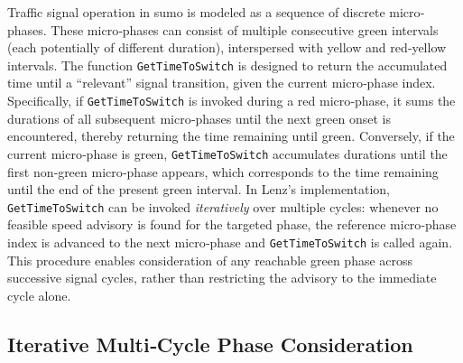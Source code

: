 Traffic signal operation in \ac{sumo} is modeled as a sequence of discrete micro‐phases. These micro‐phases can consist of multiple consecutive green intervals (each potentially of different duration), interspersed with yellow and red‐yellow intervals. The function \texttt{GetTimeToSwitch} is designed to return the accumulated time until a “relevant” signal transition, given the current micro‐phase index. Specifically, if \texttt{GetTimeToSwitch} is invoked during a red micro‐phase, it sums the durations of all subsequent micro‐phases until the next green onset is encountered, thereby returning the time remaining until green. Conversely, if the current micro‐phase is green, \texttt{GetTimeToSwitch} accumulates durations until the first non‐green micro‐phase appears, which corresponds to the time remaining until the end of the present green interval. In Lenz’s implementation, \texttt{GetTimeToSwitch} can be invoked \emph{iteratively} over multiple cycles: whenever no feasible speed advisory is found for the targeted phase, the reference micro‐phase index is advanced to the next micro‐phase and \texttt{GetTimeToSwitch} is called again. This procedure enables consideration of any reachable green phase across successive signal cycles, rather than restricting the advisory to the immediate cycle alone.

\subsection{Iterative Multi‐Cycle Phase Consideration}
\label{sec:Glosa_Iterative_Multi_Cycle}

